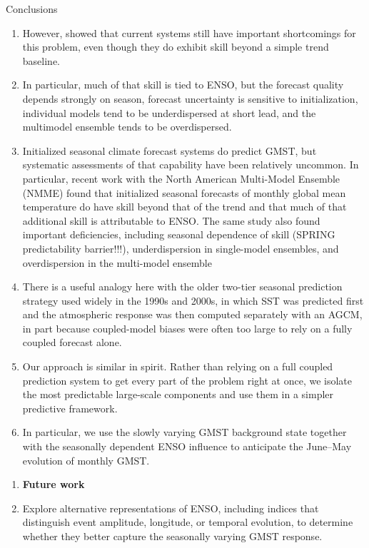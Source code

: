 \documentclass[aspectratio=169,xcolor=dvipsnames]{beamer}
\begin{document}
\begin{frame}[allowframebreaks]{Conclusions}
\begin{enumerate}
\item However, \citet{Tippett2024trends} showed that current systems
  still have important shortcomings for this problem, even though they
  do exhibit skill beyond a simple trend baseline.

\item In particular, much of that skill is tied to ENSO, but the
  forecast quality depends strongly on season, forecast uncertainty is
  sensitive to initialization, individual models tend to be
  underdispersed at short lead, and the multimodel ensemble tends to
  be overdispersed.

\item Initialized seasonal climate forecast systems do predict GMST,
  but systematic assessments of that capability have been relatively
  uncommon. In particular, recent work with the North American
  Multi-Model Ensemble (NMME) found that initialized seasonal
  forecasts of monthly global mean temperature do have skill beyond
  that of the trend and that much of that additional skill is
  attributable to ENSO. The same study also found important
  deficiencies, including seasonal dependence of skill (SPRING
  predictability barrier!!!), underdispersion in single-model
  ensembles, and overdispersion in the multi-model ensemble

\item There is a useful analogy here with the older two-tier seasonal
  prediction strategy used widely in the 1990s and 2000s, in which SST
  was predicted first and the atmospheric response was then computed
  separately with an AGCM, in part because coupled-model biases were
  often too large to rely on a fully coupled forecast
  alone. 

\item Our approach is similar in spirit. Rather than relying on a full
  coupled prediction system to get every part of the problem right at
  once, we isolate the most predictable large-scale components and use
  them in a simpler predictive framework.

\item In particular, we use the slowly varying GMST background state
  together with the seasonally dependent ENSO influence to anticipate
  the June--May evolution of monthly GMST.

\end{enumerate}

\begin{enumerate}\fontsize{6pt}{8pt}\selectfont
\item \textbf{Future work}
\item Explore alternative representations of ENSO, including indices
  that distinguish event amplitude, longitude, or temporal evolution,
  to determine whether they better capture the seasonally varying
  GMST response.


\end{enumerate}
\end{frame}
\end{document}
